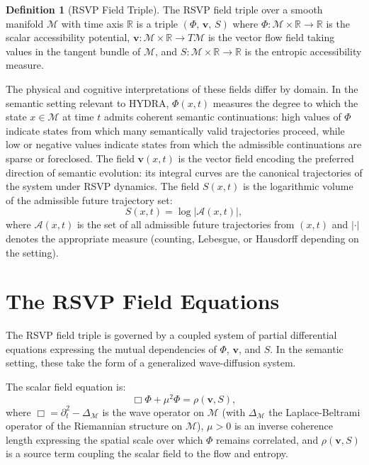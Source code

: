 \documentclass[12pt, a4paper, openany]{book}
\theoremstyle{plain}
\theoremstyle{definition}
\newtheorem{definition}[theorem]{Definition}
\theoremstyle{remark}
\newcommand{\vvec}{\mathbf{v}}
\newcommand{\Sfield}{S}
\newcommand{\Adm}{\mathcal{A}}
\newcommand{\RSVPtriple}{(\Phi,\,\vvec,\,\Sfield)}
\begin{document}
\begin{definition}[RSVP Field Triple]
The RSVP field triple over a smooth manifold $\mathcal{M}$ with time axis $\mathbb{R}$ is a triple $\RSVPtriple$ where $\Phi: \mathcal{M} \times \mathbb{R} \to \mathbb{R}$ is the scalar accessibility potential, $\vvec: \mathcal{M} \times \mathbb{R} \to T\mathcal{M}$ is the vector flow field taking values in the tangent bundle of $\mathcal{M}$, and $\Sfield: \mathcal{M} \times \mathbb{R} \to \mathbb{R}$ is the entropic accessibility measure.
\end{definition}

The physical and cognitive interpretations of these fields differ by domain. In the semantic setting relevant to HYDRA, $\Phi(x,t)$ measures the degree to which the state $x \in \mathcal{M}$ at time $t$ admits coherent semantic continuations: high values of $\Phi$ indicate states from which many semantically valid trajectories proceed, while low or negative values indicate states from which the admissible continuations are sparse or foreclosed. The field $\vvec(x,t)$ is the vector field encoding the preferred direction of semantic evolution: its integral curves are the canonical trajectories of the system under RSVP dynamics. The field $\Sfield(x,t)$ is the logarithmic volume of the admissible future trajectory set:
\[
\Sfield(x,t) = \log \bigl|\Adm(x,t)\bigr|,
\]
where $\Adm(x,t)$ is the set of all admissible future trajectories from $(x,t)$ and $|\cdot|$ denotes the appropriate measure (counting, Lebesgue, or Hausdorff depending on the setting).

\section{The RSVP Field Equations}

The RSVP field triple is governed by a coupled system of partial differential equations expressing the mutual dependencies of $\Phi$, $\vvec$, and $\Sfield$. In the semantic setting, these take the form of a generalized wave-diffusion system.

The scalar field equation is:
\begin{equation}\label{eq:scalar}
\Box \Phi + \mu^2 \Phi = \rho(\vvec, \Sfield),
\end{equation}
where $\Box = \partial_t^2 - \Delta_{\mathcal{M}}$ is the wave operator on $\mathcal{M}$ (with $\Delta_{\mathcal{M}}$ the Laplace-Beltrami operator of the Riemannian structure on $\mathcal{M}$), $\mu > 0$ is an inverse coherence length expressing the spatial scale over which $\Phi$ remains correlated, and $\rho(\vvec, \Sfield)$ is a source term coupling the scalar field to the flow and entropy.
\end{document}
